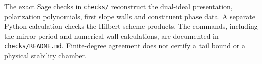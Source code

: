 The exact Sage checks in \texttt{checks/} reconstruct the
dual-ideal presentation, polarization polynomials, first slope
walls and constituent phase data. A separate Python calculation
checks the Hilbert-scheme products. The commands, including the
mirror-period and numerical-wall calculations, are documented
in \texttt{checks/README.md}. Finite-degree agreement does not
certify a tail bound or a physical stability chamber.

